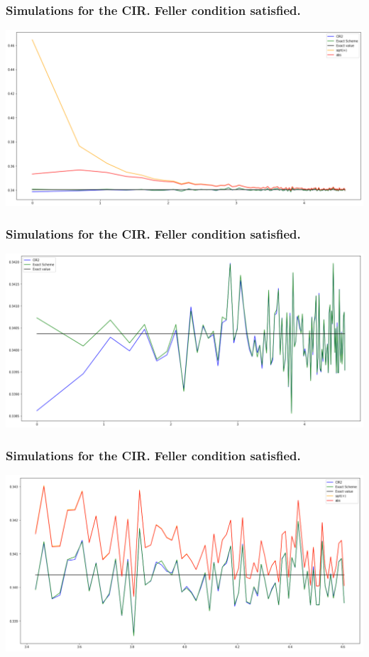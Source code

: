 \documentclass[12pt]{beamer}
\begin{document}
\begin{frame}
	\frametitle{Simulations for the CIR. Feller condition satisfied.}
	\centering
	\includegraphics[width=\textwidth]{schemes_feller.png}
\end{frame}

\begin{frame}
	\frametitle{Simulations for the CIR. Feller condition satisfied.}
	\centering
	\includegraphics[width=\textwidth]{Exact_CIR2.png}
\end{frame}

\begin{frame}
	\frametitle{Simulations for the CIR. Feller condition satisfied.}
	\centering
	\includegraphics[width=\textwidth]{schemes_feller_30.png}
\end{frame}
\end{document}
